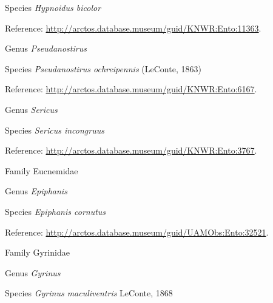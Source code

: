 \documentclass[9pt, article]{memoir}
\begin{document}
\begin{multicols}{2}
\vspace{6pt}\noindent\hspace{36pt}Species \textit{Hypnoidus bicolor}


\vspace{6pt}Reference: 
\url{http://arctos.database.museum/guid/KNWR:Ento:11363}.

\vspace{6pt}\noindent\hspace{30pt}Genus \textit{Pseudanostirus}


\vspace{6pt}\noindent\hspace{36pt}Species \textit{Pseudanostirus ochreipennis} (LeConte, 1863)


\vspace{6pt}Reference: 
\url{http://arctos.database.museum/guid/KNWR:Ento:6167}.

\vspace{6pt}\noindent\hspace{30pt}Genus \textit{Sericus}


\vspace{6pt}\noindent\hspace{36pt}Species \textit{Sericus incongruus}


\vspace{6pt}Reference: 
\url{http://arctos.database.museum/guid/KNWR:Ento:3767}.

\vspace{6pt}\noindent\hspace{24pt}Family Eucnemidae


\vspace{6pt}\noindent\hspace{30pt}Genus \textit{Epiphanis}


\vspace{6pt}\noindent\hspace{36pt}Species \textit{Epiphanis cornutus}


\vspace{6pt}Reference: 
\url{http://arctos.database.museum/guid/UAMObs:Ento:32521}.

\vspace{6pt}\noindent\hspace{24pt}Family Gyrinidae


\vspace{6pt}\noindent\hspace{30pt}Genus \textit{Gyrinus}


\vspace{6pt}\noindent\hspace{36pt}Species \textit{Gyrinus maculiventris} LeConte, 1868



\end{multicols}
\end{document}
